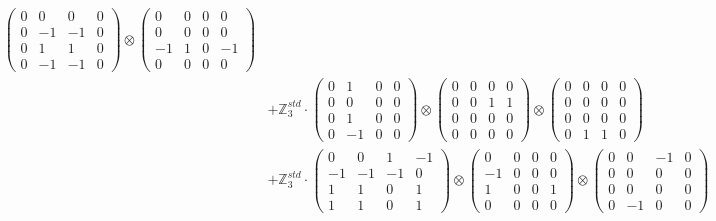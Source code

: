 \documentclass{article}
\begin{document}
{\begin{align}
            \begin{pmatrix} 0 & 0 & 0 & 0 \\ 0 & -1 & -1 & 0 \\ 0 & 1 & 1 & 0 \\ 0 & -1 & -1 & 0 \end{pmatrix} \otimes 
            \begin{pmatrix} 0 & 0 & 0 & 0 \\ 0 & 0 & 0 & 0 \\ -1 & 1 & 0 & -1 \\ 0 & 0 & 0 & 0 \end{pmatrix} \\ 
        &+ \label{Rs16-Rc11-Solution-21-c20} \mathbb{Z}_3^{std} \cdot 
            \begin{pmatrix} 0 & 1 & 0 & 0 \\ 0 & 0 & 0 & 0 \\ 0 & 1 & 0 & 0 \\ 0 & -1 & 0 & 0 \end{pmatrix} \otimes 
            \begin{pmatrix} 0 & 0 & 0 & 0 \\ 0 & 0 & 1 & 1 \\ 0 & 0 & 0 & 0 \\ 0 & 0 & 0 & 0 \end{pmatrix} \otimes 
            \begin{pmatrix} 0 & 0 & 0 & 0 \\ 0 & 0 & 0 & 0 \\ 0 & 0 & 0 & 0 \\ 0 & 1 & 1 & 0 \end{pmatrix} \\ 
        &+ \label{Rs16-Rc11-Solution-21-c21} \mathbb{Z}_3^{std} \cdot 
            \begin{pmatrix} 0 & 0 & 1 & -1 \\ -1 & -1 & -1 & 0 \\ 1 & 1 & 0 & 1 \\ 1 & 1 & 0 & 1 \end{pmatrix} \otimes 
            \begin{pmatrix} 0 & 0 & 0 & 0 \\ -1 & 0 & 0 & 0 \\ 1 & 0 & 0 & 1 \\ 0 & 0 & 0 & 0 \end{pmatrix} \otimes 
            \begin{pmatrix} 0 & 0 & -1 & 0 \\ 0 & 0 & 0 & 0 \\ 0 & 0 & 0 & 0 \\ 0 & -1 & 0 & 0 \end{pmatrix} \\ 

\end{align}}
\end{document}
